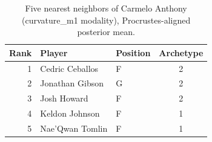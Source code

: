 \begin{table}[htbp]
  \centering\small
  \begin{tabular}{rllc}
    \toprule
    Rank & Player & Position & Archetype \\
    \midrule
    1 & Cedric Ceballos & F & 2 \\
    2 & Jonathan Gibson & G & 2 \\
    3 & Josh Howard & F & 2 \\
    4 & Keldon Johnson & F & 1 \\
    5 & Nae'Qwan Tomlin & F & 1 \\
    \bottomrule
  \end{tabular}
  \caption{Five nearest neighbors of Carmelo Anthony (curvature_m1 modality), Procrustes-aligned posterior mean.}
  \label{tab:Carmelo_Anthony_neighbors_curvature_m1}
\end{table}

